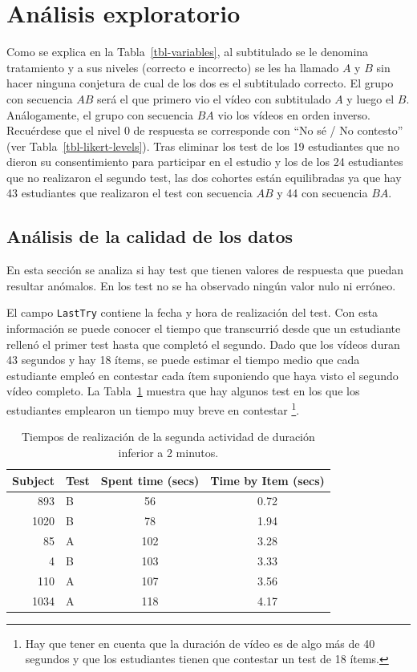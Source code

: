 \documentclass[
  12pt,
  a4paper,
  extrafontsizes,
  onecolumn,
  openright,
  table]{memoir}
\begin{document}
\hypertarget{sec-eda}{%
\section{Análisis exploratorio}\label{sec-eda}}

Como se explica en la Tabla~\ref{tbl-variables}, al subtitulado se le
denomina tratamiento y a sus niveles (correcto e incorrecto) se les ha
llamado \(A\) y \(B\) sin hacer ninguna conjetura de cual de los dos es
el subtitulado correcto. El grupo con secuencia \(AB\) será el que
primero vio el vídeo con subtitulado \(A\) y luego el \(B\).
Análogamente, el grupo con secuencia \(BA\) vio los vídeos en orden
inverso. Recuérdese que el nivel 0 de respuesta se corresponde con
\enquote{No sé / No contesto} (ver Tabla~\ref{tbl-likert-levels}). Tras
eliminar los test de los 19 estudiantes que no dieron su consentimiento
para participar en el estudio y los de los 24 estudiantes que no
realizaron el segundo test, las dos cohortes están equilibradas ya que
hay 43 estudiantes que realizaron el test con secuencia \(AB\) y 44 con
secuencia \(BA\).

\hypertarget{anuxe1lisis-de-la-calidad-de-los-datos}{%
\subsection{Análisis de la calidad de los
datos}\label{anuxe1lisis-de-la-calidad-de-los-datos}}

En esta sección se analiza si hay test que tienen valores de respuesta
que puedan resultar anómalos. En los test no se ha observado ningún
valor nulo ni erróneo.

El campo \texttt{LastTry} contiene la fecha y hora de realización del
test. Con esta información se puede conocer el tiempo que transcurrió
desde que un estudiante rellenó el primer test hasta que completó el
segundo. Dado que los vídeos duran 43 segundos y hay 18 ítems, se puede
estimar el tiempo medio que cada estudiante empleó en contestar cada
ítem suponiendo que haya visto el segundo vídeo completo. La
Tabla~\ref{tbl-washout} muestra que hay algunos test en los que los
estudiantes emplearon un tiempo muy breve en contestar \footnote{Hay que
  tener en cuenta que la duración de vídeo es de algo más de 40 segundos
  y que los estudiantes tienen que contestar un test de 18 ítems.}.

\hypertarget{tbl-washout}{}
\begin{longtable}{rlcc}
\caption{\label{tbl-washout}Tiempos de realización de la segunda actividad de duración inferior a 2
minutos. }\tabularnewline

\toprule
Subject & Test & Spent time (secs) & Time by Item (secs) \\ 
\midrule
893 & B & 56 & 0.72 \\ 
1020 & B & 78 & 1.94 \\ 
85 & A & 102 & 3.28 \\ 
4 & B & 103 & 3.33 \\ 
110 & A & 107 & 3.56 \\ 
1034 & A & 118 & 4.17 \\ 
\bottomrule
\end{longtable}
\end{document}
